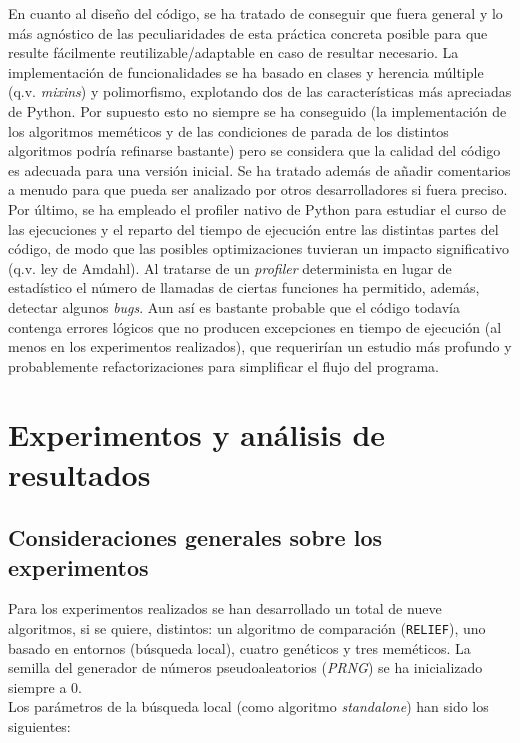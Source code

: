 \documentclass[11pt]{article}
\theoremstyle{plain}
\theoremstyle{definition}
\begin{document}
En cuanto al diseño del código, se ha tratado de conseguir que fuera general y lo más agnóstico de las peculiaridades de esta práctica concreta posible para que resulte fácilmente reutilizable/adaptable en caso de resultar necesario. La implementación de funcionalidades se ha basado en clases y herencia múltiple (q.v. \textit{mixins}) y polimorfismo, explotando dos de las características más apreciadas de Python. Por supuesto esto no siempre se ha conseguido (la implementación de los algoritmos meméticos y de las condiciones de parada de los distintos algoritmos podría refinarse bastante) pero se considera que la calidad del código es adecuada para una versión inicial. Se ha tratado además de añadir comentarios a menudo para que pueda ser analizado por otros desarrolladores si fuera preciso. \\

Por último, se ha empleado el profiler nativo de Python \cite{cprofile} para estudiar el curso de las ejecuciones y el reparto del tiempo de ejecución entre las distintas partes del código, de modo que las posibles optimizaciones tuvieran un impacto significativo (q.v. ley de Amdahl). Al tratarse de un \textit{profiler} determinista en lugar de estadístico el número de llamadas de ciertas funciones ha permitido, además, detectar algunos \textit{bugs}. Aun así es bastante probable que el código todavía contenga errores lógicos que no producen excepciones en tiempo de ejecución (al menos en los experimentos realizados), que requerirían un estudio más profundo y probablemente refactorizaciones para simplificar el flujo del programa.

\section{Experimentos y análisis de resultados}
\subsection{Consideraciones generales sobre los experimentos}

Para los experimentos realizados se han desarrollado un total de nueve algoritmos, si se quiere, distintos: un algoritmo de comparación (\texttt{RELIEF}), uno basado en entornos (búsqueda local), cuatro genéticos y tres meméticos. La semilla del generador de números pseudoaleatorios (\textit{PRNG}) se ha inicializado siempre a 0. \\

Los parámetros de la búsqueda local (como algoritmo \textit{standalone}) han sido los siguientes:
\end{document}
